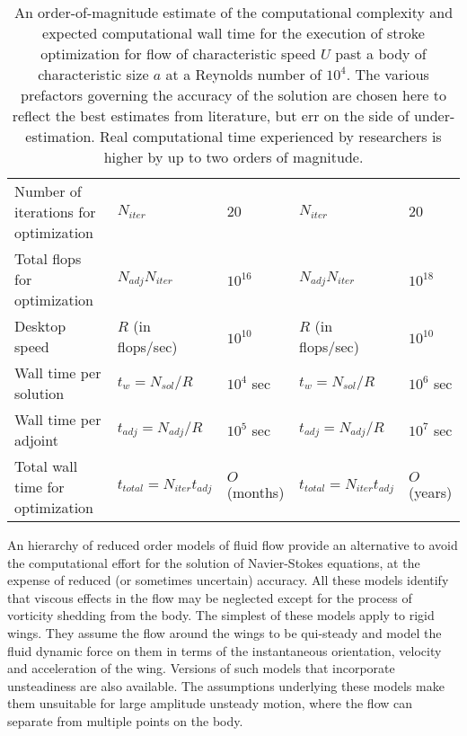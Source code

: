 \begin{table}[h]
\begin{tabular}{| p{3.5cm} | l l | l l |}
Number of iterations for optimization     &     $N_{iter}$                                            &       $20$                     &             $N_{iter} $                                    &           $20$                      \\
Total flops for optimization                       &     $N_{adj} N_{iter}$                             &       $10^{16}$            &             $N_{adj} N_{iter} $                     &           $10^{18}$             \\
Desktop speed                                           &     $R$ (in flops/sec)                              &       $10^{10}$            &              $R$ (in flops/sec)                       &          $10^{10}$              \\
Wall time per solution                               &     $t_w = N_{sol}/R$                              &       $10^4$ sec         &              $t_w = N_{sol}/R$                      &          $10^6$ sec            \\
Wall time per adjoint                                 &     $t_{adj} = N_{adj}/R$                       &        $10^5$ sec         &              $t_{adj} = N_{adj}/R$                 &          $10^7$ sec            \\
Total wall time for optimization               &     $t_{total} = N_{iter} t_{adj}$             &        $O$(months)      &              $t_{total} = N_{iter} t_{adj}$      &          $O$(years)             \\
\hline
\end{tabular}
\caption[An estimate of computational complexity of direct numerical simulation]{An order-of-magnitude estimate of the computational complexity and expected computational wall time for the execution of stroke optimization for flow of characteristic speed $U$ past a body of characteristic size $a$ at a Reynolds number of $10^4$. The various prefactors governing the accuracy of the solution are chosen here to reflect the best estimates from literature, but err on the side of under-estimation. Real computational time experienced by researchers is higher by up to two orders of magnitude.}
\end{table}


An hierarchy of reduced order models of fluid flow provide an alternative to avoid the computational effort for the solution of Navier-Stokes equations, at the expense of reduced (or sometimes uncertain) accuracy.
All these models identify that viscous effects in the flow may be neglected except for the process of vorticity shedding from the body.
The simplest of these models apply to rigid wings.
They assume the flow around the wings to be qui-steady and model the fluid dynamic force on them in terms of the instantaneous orientation, velocity and acceleration of the wing.
Versions of such models that incorporate unsteadiness are also available.
The assumptions underlying these models make them unsuitable for large amplitude unsteady motion, where the flow can separate from multiple points on the body.

